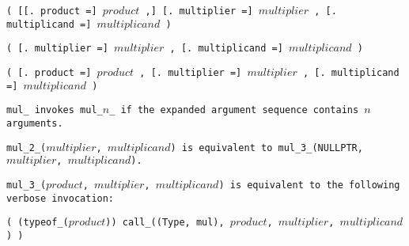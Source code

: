 
\s\s\s\tt{(} [[\tt{. product =}] $product$ \tt{,}]
[\tt{. multiplier =}] $multiplier$ \tt{,} [\tt{. multiplicand =}] $multiplicand$ \tt{)}

\s\tt{(} \phantom{[}[\tt{. multiplier =}]
$multiplier$ \tt{,} [\tt{. multiplicand =}] $multiplicand$ \tt{)}

\s\tt{(} \phantom{[}[\tt{. product =}] $product$ \tt{,}\phantom{]}
[\tt{. multiplier =}] $multiplier$ \tt{,} [\tt{. multiplicand =}] $multiplicand$ \tt{)}


\tt{mul_} invokes \tt{mul_}$n$\_ if the
expanded argument sequence contains $n$ arguments.

\tt{mul_2_(}$multiplier$\tt{,} $multiplicand$\tt{)} is equivalent to
\tt{mul_3_(NULLPTR,} $multiplier$\tt{,} $multiplicand$\tt{)}.

\tt{mul_3_(}$product$\tt{,} $multiplier$\tt{,} $multiplicand$\tt{)}
is equivalent to the following verbose invocation:

\enlargethispage*{\baselineskip}
\begin{center}
\tt{( (typeof_(}$product$\tt{)) call_((Type, mul),}
$product$\tt{,} $multiplier$\tt{,} $multiplicand$\tt{) )}
\end{center}
